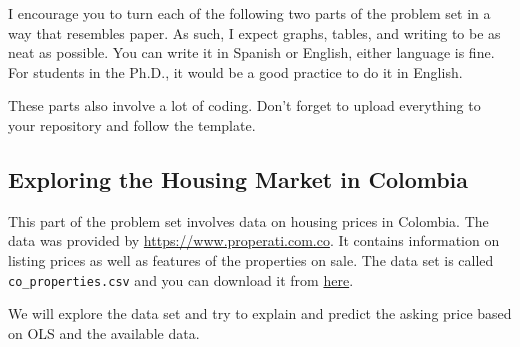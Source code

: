 \documentclass[12pt,onecolumn]{article}
\begin{document}
I encourage you to turn each of the following two parts of the problem set in a way that resembles paper. As such, I expect graphs, tables, and writing to be as neat as possible. You can write it in Spanish or English, either language is fine. For students in the Ph.D., it would be a good practice to do it in English.

These parts also involve a lot of coding. Don't forget to upload everything to your repository and follow the template. 

\subsection{Exploring the Housing Market in Colombia}

This part of the problem set involves data on housing prices in Colombia. The data was provided by \url{https://www.properati.com.co}. It contains information on listing prices as well as features of the properties on sale. The data set is called \texttt{co\_properties.csv} and you can download it from \href{https://www.dropbox.com/s/7za955mzf7b7qti/co_properties.zip?dl=0}{here}. 

We will explore the data set and try to explain and predict the asking price based on OLS and the available data.
\end{document}

